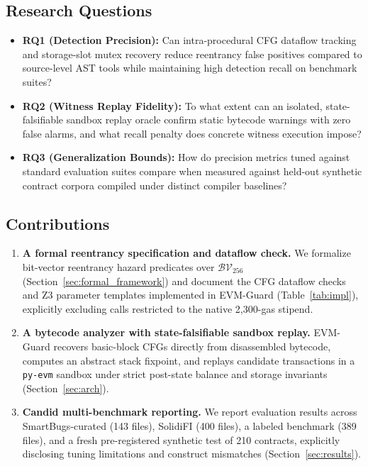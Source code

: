 \documentclass[pdflatex,sn-mathphys]{sn-jnl}
\theoremstyle{thmstyleone}
\theoremstyle{thmstyletwo}
\begin{document}
\subsection{Research Questions}\label{sec:intro:rqs}
\begin{itemize}
    \item \textbf{RQ1 (Detection Precision):} Can intra-procedural CFG dataflow tracking and storage-slot mutex recovery reduce reentrancy false positives compared to source-level AST tools while maintaining high detection recall on benchmark suites?
    \item \textbf{RQ2 (Witness Replay Fidelity):} To what extent can an isolated, state-falsifiable sandbox replay oracle confirm static bytecode warnings with zero false alarms, and what recall penalty does concrete witness execution impose?
    \item \textbf{RQ3 (Generalization Bounds):} How do precision metrics tuned against standard evaluation suites compare when measured against held-out synthetic contract corpora compiled under distinct compiler baselines?
\end{itemize}

\subsection{Contributions}\label{sec:intro:contrib}
\begin{enumerate}
    \item \textbf{A formal reentrancy specification and dataflow check.} We formalize bit-vector reentrancy hazard predicates over $\mathcal{BV}_{256}$ (Section~\ref{sec:formal_framework}) and document the CFG dataflow checks and Z3 parameter templates implemented in EVM-Guard (Table~\ref{tab:impl}), explicitly excluding calls restricted to the native 2,300-gas stipend.
    \item \textbf{A bytecode analyzer with state-falsifiable sandbox replay.} EVM-Guard recovers basic-block CFGs directly from disassembled bytecode, computes an abstract stack fixpoint, and replays candidate transactions in a \texttt{py-evm} sandbox under strict post-state balance and storage invariants (Section~\ref{sec:arch}).
    \item \textbf{Candid multi-benchmark reporting.} We report evaluation results across SmartBugs-curated (143 files), SolidiFI (400 files), a labeled benchmark (389 files), and a fresh pre-registered synthetic test of 210 contracts, explicitly disclosing tuning limitations and construct mismatches (Section~\ref{sec:results}).
\end{enumerate}
\end{document}
